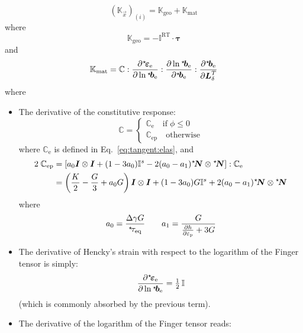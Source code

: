 \documentclass[garamond]{goose-article}
\newcommand\ST[1]{\hspace*{-.3em}~^\star\!#1}
\newcommand\T[1]{\bm{{#1}}}
\newcommand\TT[1]{\mathbb{{#1}}}
\begin{document}
\begin{equation}
  (\TT{K}_{\vec{x}})_{(i)} = \TT{K}_\mathrm{geo} + \TT{K}_\mathrm{mat}
\end{equation}
where
\begin{equation}
  \TT{K}_\mathrm{geo} = - \TT{I}^\mathrm{RT} \cdot \T{\tau}
\end{equation}
and
\begin{equation}
  \TT{K}_\mathrm{mat} = \TT{C} : \frac{\partial \ST{\T{\varepsilon}}_\mathrm{e}}{\partial \ln \ST{\T{b}}_\mathrm{e}} : \frac{\partial \ln \ST{\T{b}}_\mathrm{e}}{\partial \ST{\T{b}}_\mathrm{e}} : \frac{\partial \ST{\T{b}}_\mathrm{e}}{\partial \T{L}_\delta^T}
\end{equation}
where
\begin{itemize}
  \item The derivative of the constitutive response:
  \begin{equation}
    \TT{C} =
    \begin{cases}
      \TT{C}_\mathrm{e} \quad\mathrm{if}\; \phi \leq 0 \\
      \TT{C}_\mathrm{ep} \quad\mathrm{otherwise}
    \end{cases}
  \end{equation}
  where $\TT{C}_\mathrm{e}$ is defined in Eq.~\eqref{eq:tangent:elas}, and
  \begin{align}
    2 \; \TT{C}_\mathrm{ep} &= \left[ a_0 \T{I} \otimes \T{I} + (1 - 3 a_0) \TT{I}^s - 2 (a_0 - a_1) \ST{\T{N}} \otimes \ST{\T{N}} \right] : \TT{C}_\mathrm{e}
    \\
    &= \left( \frac{K}{2} - \frac{G}{3} + a_0 G \right) \T{I} \otimes \T{I} + (1 - 3 a_0) G \TT{I}^s + 2 (a_0 - a_1) \ST{\T{N}} \otimes \ST{\T{N}}
  \end{align}
  where
  \begin{equation}
    a_0 = \frac{\Delta \gamma G}{\ST{\tau}_\mathrm{eq}}
    \qquad
    a_1 = \frac{G}{\frac{\partial h}{\partial \varepsilon_\mathrm{p}} + 3 G}
  \end{equation}
  \item The derivative of Hencky’s strain with respect to the logarithm of the Finger tensor is simply:
  \begin{equation}
    \frac{\partial \ST{\T{\varepsilon}}_\mathrm{e}}{\partial \ln \ST{\T{b}}_\mathrm{e}} = \tfrac{1}{2} \, \TT{I}
  \end{equation}
  (which is commonly absorbed by the previous term).
  \item The derivative of the logarithm of the Finger tensor reads:

\end{itemize}
\end{document}
